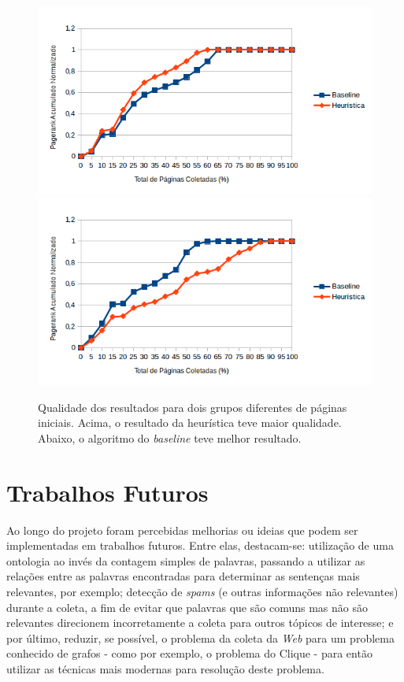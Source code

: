 \documentclass[a4paper,12pt,titlepage]{article}
\begin{document}
\begin{figure}[H]
     \centering
     \includegraphics[scale=1]{figures/h1.png}
     \includegraphics[scale=1]{figures/h2.png}
     \caption{Qualidade dos resultados para dois grupos diferentes de páginas iniciais. Acima, o resultado da heurística teve maior qualidade. Abaixo, o algoritmo do \textit{baseline} teve melhor resultado.}
     \label{bsp}
\end{figure}



\section{Trabalhos Futuros}

Ao longo do projeto foram percebidas melhorias ou ideias que podem ser implementadas em trabalhos futuros. Entre elas, destacam-se: utilização de uma ontologia ao invés da contagem simples de palavras, passando a utilizar as relações entre as palavras encontradas para determinar as sentenças mais relevantes, por exemplo; detecção de \textit{spams} (e outras informações não relevantes) durante a coleta, a fim de evitar que palavras que são comuns mas não são relevantes direcionem incorretamente a coleta para outros tópicos de interesse; e por último, reduzir, se possível, o problema da coleta da \textit{Web} para um problema conhecido de grafos - como por exemplo, o problema do Clique - para então utilizar as técnicas mais modernas para resolução deste problema.
\end{document}
